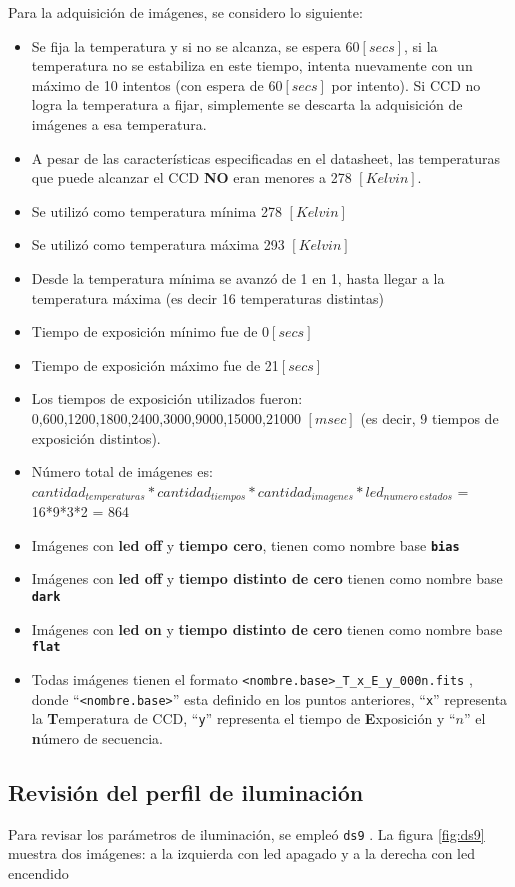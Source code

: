 \documentclass[a4paper,10pt]{article}
\begin{document}
Para la adquisición de imágenes, se considero lo siguiente:
\begin{itemize}
\item Se fija la temperatura y si no se alcanza, se espera 60$[secs]$, si la
temperatura no se estabiliza en este tiempo, intenta nuevamente con un máximo
de 10 intentos (con espera de 60$[secs]$ por intento). Si CCD no logra la temperatura
a fijar,  simplemente se descarta la adquisición de imágenes a esa temperatura.

\item A pesar de las características especificadas en el datasheet, las temperaturas que puede alcanzar el CCD \textbf{NO} eran menores a 278 $[Kelvin]$. 
\item Se utilizó como temperatura mínima 278 $[Kelvin]$
\item Se utilizó como temperatura máxima 293 $[Kelvin]$
\item Desde la temperatura mínima se avanzó de 1 en 1, hasta llegar a la temperatura máxima (es decir 16 temperaturas distintas)
\item Tiempo de exposición mínimo fue de 0$[secs]$
\item Tiempo de exposición máximo fue de 21$[secs]$
\item Los tiempos de exposición utilizados fueron: 0,600,1200,1800,2400,3000,9000,15000,21000 $[msec]$ (es decir, 9 tiempos de exposición distintos).
\item Número total de imágenes es:  $cantidad_{temperaturas}*cantidad_{tiempos}*cantidad_{imagenes}*led_{numero\ estados}$ = 16*9*3*2 =  864
\item Imágenes con \textbf{led off} y \textbf{tiempo cero}, tienen como nombre base \textbf{{\tt bias }}
\item Imágenes con \textbf{led off} y \textbf{tiempo distinto de cero} tienen como nombre base \textbf{{\tt dark }}
\item Imágenes con \textbf{led on} y  \textbf{tiempo distinto de cero} tienen como nombre base \textbf{{\tt flat }}
\item Todas imágenes tienen el formato {\tt <nombre.base>\_T\_x\_E\_y\_000n.fits} , donde ``{\tt <nombre.base>}'' esta definido en los puntos anteriores, ``{\tt x}'' representa la \textbf{T}emperatura de CCD, ``{\tt y}'' representa el tiempo de \textbf{E}xposición y ``$n$'' el \textbf{n}úmero de secuencia.
\end{itemize}

\subsection{Revisión del perfil de iluminación}
Para revisar los parámetros de iluminación, se empleó {\tt ds9} . La figura \ref{fig:ds9} muestra dos imágenes: a la izquierda con led apagado y a la derecha con led encendido
\end{document}
